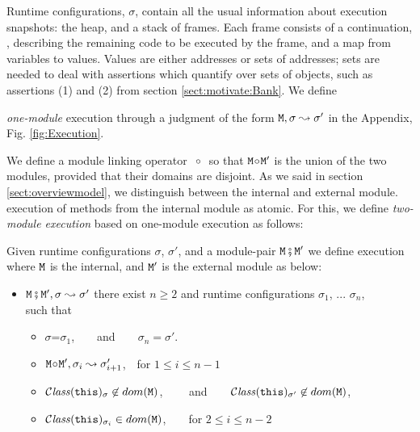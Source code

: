 Runtime configurations, $\sigma$,  contain   all the usual information about execution snapshots: the heap, and a
stack of frames. 
%
Each frame consists of a continuation, , describing the remaining code to be executed by the
frame, and a map from
variables to values. Values are either addresses or sets of addresses; sets 
are needed to deal with assertions which quantify over sets of
objects, such as assertions
(1) and (2) from section \ref{sect:motivate:Bank}.
% 
We define {\emph{one-module} execution  through a judgment of the form ${\mbox{\tt{\ensuremath{{\mbox{\tt{M}}}}}}}, \sigma \leadsto \sigma'$ in the Appendix, Fig.  \ref{fig:Execution}. 
%
  

We define a module linking operator \  $\!\circ\!$ \  so that
${\mbox{\tt{\ensuremath{{\mbox{\tt{M}}}}}}}\!\circ\!{\mbox{\tt{\ensuremath{{\mbox{\tt{M}}}}}}}'$ is the union of the two modules, provided that their domains are disjoint.
As we said in section \ref{sect:overviewmodel}, we distinguish  between the internal and external module.   execution of 
methods from the internal module as atomic. For this, we define \emph{two-module execution}  based on
one-module execution as follows:

\begin{definition}
\label{def:execution:internal:external}
\label{def:module_pair_execution} 
Given runtime configurations $\sigma$,  $\sigma'$,  and a module-pair ${\mbox{\tt{\ensuremath{{\mbox{\tt{M}}}}}}} \fatsemi {\mbox{\tt{\ensuremath{{\mbox{\tt{M}}}}}}}'$ we define
execution where ${\mbox{\tt{\ensuremath{{\mbox{\tt{M}}}}}}}$ is the internal, and ${\mbox{\tt{\ensuremath{{\mbox{\tt{M}}}}}}}'$ is the external module as below:
 
\begin{itemize}
\item
${\mbox{\tt{\ensuremath{{\mbox{\tt{M}}}}}}} \fatsemi {\mbox{\tt{\ensuremath{{\mbox{\tt{M}}}}}}}', \sigma \leadsto \sigma'$ \IFF
there exist  $n\geq 2$ and runtime configurations $\sigma_1$,  ...
$\sigma_n$, \\such that
\begin{itemize}
\item
$\sigma$=$\sigma_1$,\ \  \ \ and\ \ \ \ $\sigma_n=\sigma'$.
\item
${\mbox{\tt{\ensuremath{{\mbox{\tt{M}}}}}}} \!\circ\! {\mbox{\tt{\ensuremath{{\mbox{\tt{M}}}}}}}', \sigma_i \leadsto \sigma_{i+1}'$,\  \  for $1\leq i \leq n\!-\!1$
\item
${\mathcal C}{\mathit{lass}}({\mbox{\tt{this}}})_{\sigma}\not\in dom({{\mbox{\tt{\ensuremath{{\mbox{\tt{M}}}}}}}})$,  \ \  \ \ and\ \ \ \
${\mathcal C}{\mathit{lass}}({\mbox{\tt{this}}})_{\sigma'} \not\in dom({{\mbox{\tt{\ensuremath{{\mbox{\tt{M}}}}}}}})$,
\item
 ${\mathcal C}{\mathit{lass}}({\mbox{\tt{this}}})_{\sigma_i} \in dom({{\mbox{\tt{\ensuremath{{\mbox{\tt{M}}}}}}}})$,\ \ \ \ for $2\leq i \leq n\!-\!2$
\end{itemize}
\end{itemize}


\end{definition}}
